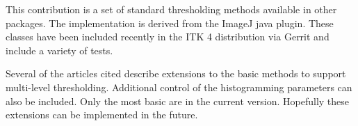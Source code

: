 \documentclass{InsightArticle}
\begin{document}
This contribution is a set of standard thresholding methods available
in other packages. The implementation is derived from the ImageJ
java plugin. These classes have been included recently in the ITK 4
distribution via Gerrit and include a variety of tests.

Several of the articles cited describe extensions to the basic methods
to support multi-level thresholding. Additional control of the
histogramming parameters can also be included. Only the most basic are
in the current version. Hopefully these extensions can be implemented
in the future.

\appendix





\nocite{ITKSoftwareGuide}
\end{document}
